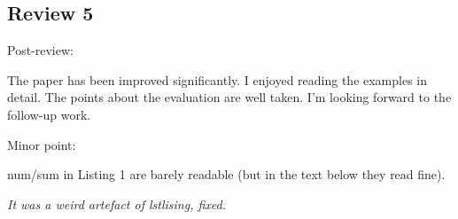 
\subsection*{Review 5}

Post-review:

The paper has been improved significantly. I enjoyed reading the examples in detail. The points about the evaluation are well taken. I'm looking forward to the follow-up work.

Minor point:

num/sum in Listing 1 are barely readable (but in the text below they read fine).

\emph{It was a weird artefact of lstlising, fixed.}
